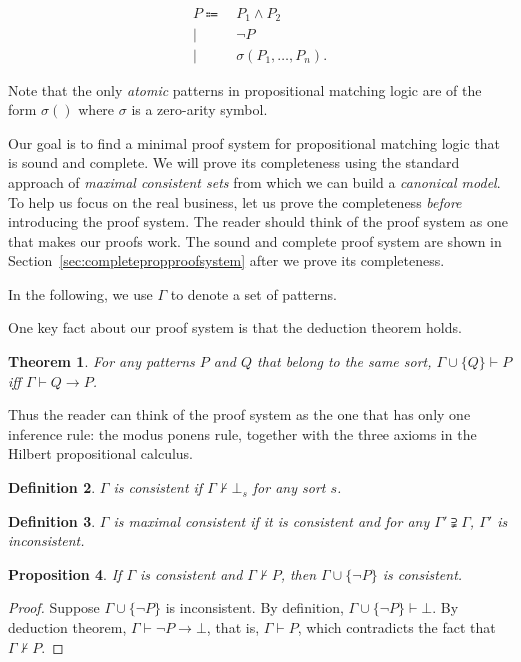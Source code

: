 \documentclass{article}
\theoremstyle{plain}
\newtheorem{thm}{Theorem}
\newtheorem{prop}[thm]{Proposition}
\newtheorem{defn}[thm]{Definition}
\begin{document}
\begin{align}
P \Coloneqq\  & P_1 \wedge P_2 \nonumber \\
       \mid\  & \neg P \nonumber \\
       \mid\  & \sigma(P_1,\dots,P_n). \nonumber
\end{align}

Note that the only \emph{atomic} patterns in propositional matching logic are of the form $\sigma()$ where $\sigma$ is a zero-arity symbol. 

Our goal is to find a minimal proof system for propositional matching logic that is sound and complete. We will prove its completeness using the standard approach of \emph{maximal consistent sets} from which we can build a \emph{canonical model}. To help us focus on the real business, let us prove the completeness \emph{before} introducing the proof system. The reader should think of the proof system as one that makes our proofs work. The sound and complete proof system are shown in Section~\ref{sec:completepropproofsystem} after we prove its completeness.

In the following, we use $\Gamma$ to denote a set of patterns.

One key fact about our proof system is that the deduction theorem holds. 

\begin{thm}
For any patterns $P$ and $Q$ that belong to the same sort, $\Gamma \cup \{Q\} \vdash P$ iff $\Gamma \vdash Q \to P$.
\end{thm}

Thus the reader can think of the proof system as the one that has only one inference rule: the modus ponens rule, together with the three axioms in the Hilbert propositional calculus.

\begin{defn}
  $\Gamma$ is consistent if $\Gamma \not \vdash \bot_s$ for any sort $s$.
\end{defn}

\begin{defn}
  $\Gamma$ is maximal consistent if it is consistent and for any $\Gamma' \supsetneqq \Gamma$, $\Gamma'$ is inconsistent.
\end{defn}

\begin{prop}
If $\Gamma$ is consistent and $\Gamma \not \vdash P$, then $\Gamma \cup \{\neg P\}$ is consistent.
\end{prop}
\begin{proof}
Suppose $\Gamma \cup \{\neg P\}$ is inconsistent. By definition, $\Gamma \cup \{\neg P\} \vdash \bot$. By deduction theorem, $\Gamma \vdash \neg P \to \bot$, that is, $\Gamma \vdash P$, which contradicts the fact that $\Gamma \not \vdash P$.
\end{proof}
\end{document}
